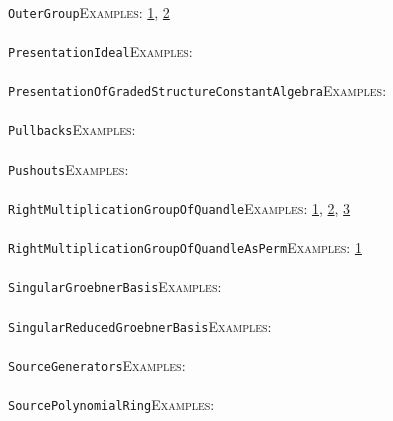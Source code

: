 \documentclass[a4paper,11pt]{report}
\begin{document}
{{ \\
 \texttt{OuterGroup}{\nobreakspace}{\nobreakspace}{\nobreakspace}{\nobreakspace}\textsc{Examples:} \href{../www/SideLinks/About/aboutCoefficientSequence.html} {1}{\nobreakspace}, \href{../www/SideLinks/About/aboutGouter.html} {2}{\nobreakspace} \\
 \\
 \texttt{PresentationIdeal}{\nobreakspace}{\nobreakspace}{\nobreakspace}{\nobreakspace}\textsc{Examples:} \\
 \\
 \texttt{PresentationOfGradedStructureConstantAlgebra}{\nobreakspace}{\nobreakspace}{\nobreakspace}{\nobreakspace}\textsc{Examples:} \\
 \\
 \texttt{Pullbacks}{\nobreakspace}{\nobreakspace}{\nobreakspace}{\nobreakspace}\textsc{Examples:} \\
 \\
 \texttt{Pushouts}{\nobreakspace}{\nobreakspace}{\nobreakspace}{\nobreakspace}\textsc{Examples:} \\
 \\
 \texttt{RightMultiplicationGroupOfQuandle}{\nobreakspace}{\nobreakspace}{\nobreakspace}{\nobreakspace}\textsc{Examples:} \href{../www/SideLinks/About/aboutQuandles2.html} {1}{\nobreakspace}, \href{../www/SideLinks/About/aboutQuandles.html} {2}{\nobreakspace}, \href{../www/SideLinks/About/aboutKnotsQuandles.html} {3}{\nobreakspace} \\
 \\
 \texttt{RightMultiplicationGroupOfQuandleAsPerm}{\nobreakspace}{\nobreakspace}{\nobreakspace}{\nobreakspace}\textsc{Examples:} \href{../www/SideLinks/About/aboutQuandles.html} {1}{\nobreakspace} \\
 \\
 \texttt{SingularGroebnerBasis}{\nobreakspace}{\nobreakspace}{\nobreakspace}{\nobreakspace}\textsc{Examples:} \\
 \\
 \texttt{SingularReducedGroebnerBasis}{\nobreakspace}{\nobreakspace}{\nobreakspace}{\nobreakspace}\textsc{Examples:} \\
 \\
 \texttt{SourceGenerators}{\nobreakspace}{\nobreakspace}{\nobreakspace}{\nobreakspace}\textsc{Examples:} \\
 \\
 \texttt{SourcePolynomialRing}{\nobreakspace}{\nobreakspace}{\nobreakspace}{\nobreakspace}\textsc{Examples:} \\
}}
\end{document}
